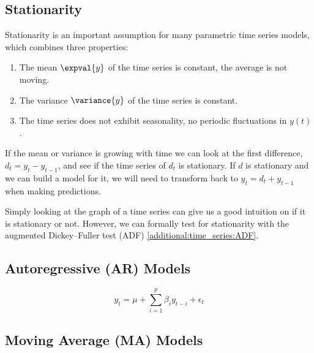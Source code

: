 \subsection{Stationarity}
\label{additional:time_series:stationarity}

Stationarity is an important assumption for many parametric time series models,
which combines three properties:

\begin{enumerate}[noitemsep]
\item The mean $\expval{y}$ of the time series is constant, \ie the average is not moving.\label{item:time_series:stationarity:constant_mean}
\item The variance $\variance{y}$ of the time series is constant.\label{item:time_series:stationarity:constant_var}
\item The time series does not exhibit seasonality, \ie no periodic fluctuations in $y\left(t\right)$.
\label{item:time_series:stationarity:seasonality}
\end{enumerate}

If the mean or variance is growing with time
we can look at the first difference, $d_{t} = y_{t} -y_{t-1}$,
and see if the time series of $d_{t}$ is stationary.
If $d$ is stationary and we can build a model for it, we will
need to transform back to $y_{t} = d_{t} + y_{t-1}$ when making predictions.

Simply looking at the graph of a time series can give us
a good intuition on if it is stationary or not.
However, we can formally test for stationarity
with the augmented Dickey--Fuller test (ADF) \cref{additional:time_series:ADF}.

\subsection{Autoregressive (AR) Models}
\label{additional:time_series:AR}

\begin{equation}\label{eq:time_series:AR}
y_{t} = \mu + \sum_{i=1}^{p} \beta_{i} y_{t-i} + \epsilon_{t}
\end{equation}


\subsection{Moving Average (MA) Models}
\label{additional:time_series:MA}

